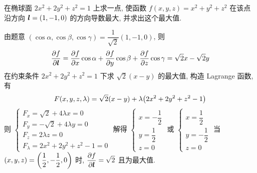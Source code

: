 \begin{example}
    在椭球面 $2x^2+2y^2+z^2=1$ 上求一点, 使函数 $f(x,y,z)=x^2+y^2+z^2$ 在该点沿方向 $\vb*{l}=(1,-1,0)$ 的方向导数最大, 并求出这个最大值.
\end{example}
\begin{solution}
    由题意 $(\cos\alpha,\cos\beta,\cos\gamma)=\dfrac{1}{\sqrt{2}}(1,-1,0)$, 则 
    $$
    \pdv{f}{\vb*{l}}=\pdv{f}{x}\cos\alpha+\pdv{f}{y}\cos\beta+\pdv{f}{z}\cos\gamma=\sqrt{2}x-\sqrt{2}y
    $$
    在约束条件 $2x^2+2y^2+z^2=1$ 下求 $\sqrt{2}(x-y)$ 的最大值, 构造 Lagrange 函数, 有 
    $$
    F(x, y, z,\lambda)=\sqrt{2}(x-y)+\lambda\qty(2x^2+2y^2+z^2-1)
    $$
    则 $ \begin{cases}
        F_{x}=\sqrt{2}+4\lambda x=0\\ 
        F_{y}=-\sqrt{2}+4\lambda y=0\\ 
        F_{z}=2\lambda z=0\\ 
        F_{\lambda}=2x^2+2y^2+z^2-1=0
    \end{cases} $ 解得 $ \begin{cases}
        x=-\dfrac{1}{2}\\y=\dfrac{1}{2}\\ z=0
    \end{cases} $ 或 $ \begin{cases}
        x=\dfrac{1}{2}\\ y=-\dfrac{1}{2}\\ z=0
    \end{cases} $ 当 $(x,y,z)=\qty(\dfrac{1}{2},-\dfrac{1}{2},0)$ 时, $ \displaystyle \pdv{f}{\vb*{l}}=\sqrt{2} $ 且为最大值.
\end{solution}

